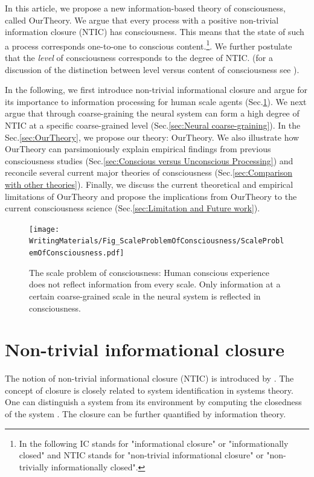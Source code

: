 \documentclass[utf8]{article}
\begin{document}
		In this article, we propose a new information-based theory of consciousness, called \ac{OurTheory}. We argue that every process with a positive non-trivial information closure (NTIC) has consciousness. This means that the state of such a process corresponds one-to-one to conscious content.\footnote{In the following IC stands for "informational closure" or "informationally closed" and NTIC stands for "non-trivial informational closure" or "non-trivially informationally closed".}. We further postulate that the \textit{level} of consciousness corresponds to the degree of NTIC. (for a discussion of the distinction between level versus content of consciousness see \cite{laureys2005neural, overgaard2010neural}).
		
		In the following, we first introduce non-trivial informational closure and argue for its importance to information processing for human scale agents (Sec.\ref{sec:Non-trivial informational closure}). We next argue that through coarse-graining the neural system can form a high degree of NTIC at a specific coarse-grained level (Sec.\ref{sec:Neural coarse-graining}). In the Sec.\ref{sec:OurTheory}, we propose our theory: \acf{OurTheory}. We also illustrate how \ac{OurTheory} can parsimoniously explain empirical findings from previous consciousness studies (Sec.\ref{sec:Conscious versus Unconscious Processing}) and reconcile several current major theories of consciousness (Sec.\ref{sec:Comparison with other theories}). Finally, we discuss the current theoretical and empirical limitations of \ac{OurTheory} and propose the implications from \ac{OurTheory} to the current consciousness science (Sec.\ref{sec:Limitation and Future work}). 


		\begin{figure}[H]
		    \centering
			\texttt{[image: WritingMaterials/Fig\_ScaleProblemOfConsciousness/ScaleProblemOfConsciousness.pdf]}
			\caption{The scale problem of consciousness: Human conscious experience does not reflect information from every scale. Only information at a certain coarse-grained scale in the neural system is reflected in consciousness.}
			\label{fig:scaleproblem}
	   	\end{figure}


	\section{Non-trivial informational closure} \label{sec:Non-trivial informational closure}
		The notion of non-trivial informational closure (NTIC) is introduced by \cite{BERTSCHINGER.2006}. The concept of closure is closely related to system identification in systems theory. One can distinguish a system from its environment by computing the closedness of the system \citep{maturana1991autopoiesis, rosen1991life, pattee2012evolving, luhmann1995probleme}. The closure can be further quantified by information theory.
\end{document}
